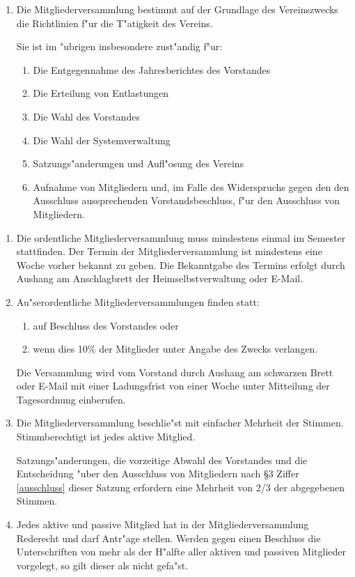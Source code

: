 \begin{enumerate}
\item[]
  \begin{sloppypar}
    Die Mitgliederversammlung bestimmt auf der Grundlage des Vereinszwecks 
    die Richtlinien f"ur die T"atigkeit des Vereins.
  \end{sloppypar}

  Sie ist im "ubrigen insbesondere zust"andig f"ur:
  \begin{enumerate}
  \item Die Entgegennahme des Jahresberichtes des Vorstandes
  \item Die Erteilung von Entlastungen
  \item Die Wahl des Vorstandes
  \item Die Wahl der Systemverwaltung
  \item Satzungs"anderungen und Aufl"osung des Vereins
  \item Aufnahme von Mitgliedern und, im Falle des Widerspruchs gegen den den
    Ausschluss aussprechenden Vorstandsbeschluss, f"ur den Ausschluss von
    Mitgliedern.
\end{enumerate}
\end{enumerate}

\begin{enumerate}
\item Die ordentliche Mitgliederversammlung muss mindestens einmal im Semester
  stattfinden. Der Termin der Mitgliederversammlung ist mindestens eine Woche
  vorher bekannt zu geben. Die Bekanntgabe des Termins erfolgt durch Aushang
  am Anschlagbrett der Heimselbstverwaltung oder E-Mail.
\item Au"serordentliche Mitgliederversammlungen finden statt:
  \begin{enumerate}
  \item auf Beschluss des Vorstandes oder
  \item wenn dies 10\% der Mitglieder unter Angabe des Zwecks verlangen.
  \end{enumerate}
  Die Versammlung wird vom Vorstand durch Aushang am schwarzen Brett oder
  E-Mail mit einer Ladungsfrist von einer Woche unter Mitteilung der
  Tagesordnung einberufen. 
\item Die Mitgliederversammlung beschlie"st mit einfacher Mehrheit der 
  Stimmen. Stimmberechtigt ist jedes aktive Mitglied.

  Satzungs"anderungen, die vorzeitige Abwahl des Vorstandes und die 
  Entscheidung "uber den Ausschluss von Mitgliedern nach \S{}3
  Ziffer \ref{ausschluss} dieser Satzung erfordern eine Mehrheit von 2/3 der
  abgegebenen Stimmen.
\item Jedes aktive und passive Mitglied hat in der Mitgliederversammlung
  Rederecht und darf Antr"age stellen. Werden gegen einen Beschluss die
  Unterschriften von mehr als der H"alfte aller aktiven und passiven
  Mitglieder vorgelegt, so gilt dieser als nicht gefa"st.
\end{enumerate}

